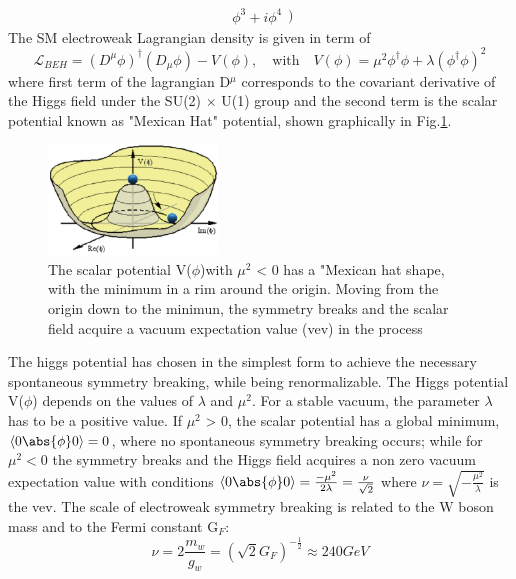 \begin{itemize}
\begin{equation}
\begin{array}{c}
\phi^{3} + i\phi^{4}
\end{array}\Big)
\end{equation}
The SM electroweak Lagrangian density is given in term of
\begin{equation}\label{eq:beh_lagrange}
\mathcal{L}_{BEH} = (D^{\mu}\phi)^{\dagger}(D_{\mu}\phi) - V(\phi), \quad \textrm{with}\quad 
        V(\phi) = \mu^{2}\phi^{\dagger}\phi + \lambda(\phi^{\dagger}\phi)^{2}
\end{equation}
where first term of the lagrangian D$^{\mu}$ corresponds to the covariant derivative of the Higgs field under the SU(2) $\times$ U(1) group and the second term is the scalar potential known as "Mexican Hat" potential, shown graphically in Fig.\ref{fig:mexican_hat}. 
\begin{figure}[h]
\centering
\captionsetup{width=0.8\linewidth}
\includegraphics[width=0.4\textwidth]{fig/chapt2/mexican_hat.png}
\caption{\label{fig:mexican_hat}The scalar potential V($\phi$)with $\mu^{2}$ < 0 has a "Mexican hat shape, with the minimum in a rim around the origin. Moving from the origin down to the minimun, the symmetry breaks and the scalar field acquire a vacuum expectation value (vev) in the process}
\end{figure}
The higgs potential has chosen in the simplest form to achieve the necessary spontaneous symmetry breaking, while being renormalizable. The Higgs potential V($\phi$) depends on the values of $\lambda$ and $\mu^{2}$. For a stable vacuum, the parameter $\lambda$ has to be a positive value. If $\mu^{2}$ > 0, the scalar potential has a global minimum, $\langle 0\abs{\phi}0\rangle = 0$, where no spontaneous symmetry breaking occurs; while for $\mu^{2} < 0$ the symmetry breaks and the Higgs field acquires a non zero vacuum expectation value with conditions $\langle 0\abs{\phi}0\rangle = \frac{-\mu^{2}}{2\lambda} = \frac{\nu}{\sqrt{2}}$ where $\nu = \sqrt{-\frac{\mu^{2}}{\lambda}}$ is the vev. The scale of electroweak symmetry breaking is related to the W boson mass and to the Fermi constant G$_{F}$:
\begin{equation}
\nu = 2\frac{m_{w}}{g_{w}} = (\sqrt{2}G_{F})^{-\frac{1}{2}} \approx 240 GeV 

\end{equation}
\end{itemize}
